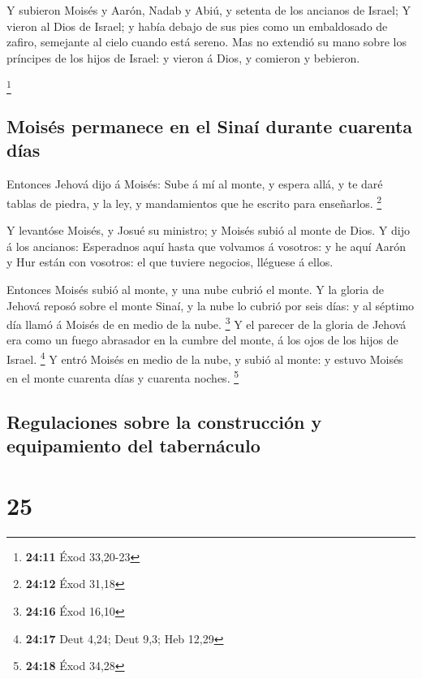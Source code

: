  Y subieron Moisés y Aarón, Nadab y Abiú, y setenta de los
ancianos de Israel;  Y vieron al Dios de Israel; y había
debajo de sus pies como un embaldosado de zafiro, semejante al cielo
cuando está sereno.  Mas no extendió su mano sobre los
príncipes de los hijos de Israel: y vieron á Dios, y comieron y
bebieron.

\footnote{\textbf{24:11} Éxod 33,20-23}

\hypertarget{moisuxe9s-permanece-en-el-sinauxed-durante-cuarenta-duxedas}{%
\subsection{Moisés permanece en el Sinaí durante cuarenta
días}\label{moisuxe9s-permanece-en-el-sinauxed-durante-cuarenta-duxedas}}

 Entonces Jehová dijo á Moisés: Sube á mí al monte, y
espera allá, y te daré tablas de piedra, y la ley, y mandamientos que he
escrito para enseñarlos. \footnote{\textbf{24:12} Éxod 31,18}

 Y levantóse Moisés, y Josué su ministro; y Moisés subió
al monte de Dios.  Y dijo á los ancianos: Esperadnos aquí
hasta que volvamos á vosotros: y he aquí Aarón y Hur están con vosotros:
el que tuviere negocios, lléguese á ellos.

 Entonces Moisés subió al monte, y una nube cubrió el
monte.  Y la gloria de Jehová reposó sobre el monte
Sinaí, y la nube lo cubrió por seis días: y al séptimo día llamó á
Moisés de en medio de la nube. \footnote{\textbf{24:16} Éxod 16,10}
 Y el parecer de la gloria de Jehová era como un fuego
abrasador en la cumbre del monte, á los ojos de los hijos de Israel.
\footnote{\textbf{24:17} Deut 4,24; Deut 9,3; Heb 12,29} 
Y entró Moisés en medio de la nube, y subió al monte: y estuvo Moisés en
el monte cuarenta días y cuarenta noches. \footnote{\textbf{24:18} Éxod
  34,28}

\hypertarget{regulaciones-sobre-la-construcciuxf3n-y-equipamiento-del-tabernuxe1culo}{%
\subsection{Regulaciones sobre la construcción y equipamiento del
tabernáculo}\label{regulaciones-sobre-la-construcciuxf3n-y-equipamiento-del-tabernuxe1culo}}

\hypertarget{section-24}{%
\section{25}\label{section-24}}

